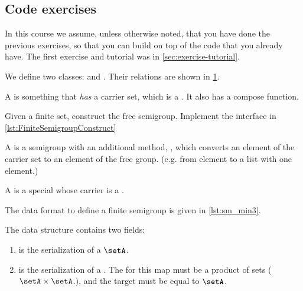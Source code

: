 \subsection{Code exercises}

\begin{remark}
  In this course we assume, unless otherwise noted, that you have done the previous exercises, so that you can build on top of the code that you already have. The first exercise and tutorial was in \cref{sec:exercise-tutorial}.
\end{remark}

\begin{figure*}[b]
  \label{fig:uml_semigroup}
\end{figure*}

We define two classes: \Semigroup and \FiniteSemigroup.
Their relations are shown in \cref{fig:uml_semigroup}.

A \Semigroup is something that \emph{has} a carrier set, which is a \Setoid.
It also has a compose function.



\begin{codeexercise}
  \label{ex:TestFiniteSemigroupConstruct}
  Given a finite set, construct the free semigroup.
  Implement the interface in \cref{lst:FiniteSemigroupConstruct}
\end{codeexercise}


A \FreeSemigroup is a semigroup with an additional method, , which converts an element of the carrier set to an element of the free group. (e.g. from element to a list with one element.)




A \FiniteSemigroup is a special \Semigroup whose carrier is a \FiniteSet.




The data format to define a finite semigroup is given in \cref{lst:sm_min3}.

The data structure contains two fields:
\begin{enumerate}
  \item {} is the serialization of a \FiniteSet $\setA$.
  \item {} is the serialization of a \FiniteMap. The 
  for this map must be a product of sets ($\setA \times \setA$.), and the target
  must be equal to $\setA$.
\end{enumerate}

